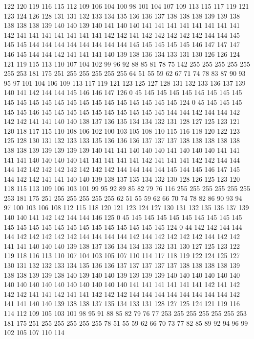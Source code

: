 122 120 119 116 115 112 109 106 104 100 98 101 104 107 109 113 115 117 119 121
123 124 126 128 131 131 132 133 134 135 136 136 137 138 138 138 139 139 138 138
138 138 139 140 140 139 140 141 140 140 141 141 141 141 141 141 141 141 142 141
141 141 141 141 141 141 142 142 141 142 142 142 142 142 144 144 145 145 145 144
144 144 144 144 144 144 144 145 145 145 145 145 146 147 147 147 146 145 144 144
142 141 141 141 140 139 138 136 134 133 131 130 126 126 124 121 119 115 113 110
107 104 102 99 96 92 88 85 81 78 75 142 255 255 255 255 255 255 253 181
175 251 255 255 255 255 255 64 51 55 59 62 67 71 74 78 83 87 90 93
95 97 101 104 106 109 113 117 119 121 123 125 127 128 131 132 133 136 137 139
140 141 142 144 144 145 146 146 147 126 0 45 145 145 145 145 145 145 145 145
145 145 145 145 145 145 145 145 145 145 145 145 145 145 124 0 45 145 145 145
145 145 146 145 145 145 145 145 145 145 145 145 145 144 144 142 144 144 142 142
142 141 141 140 140 138 137 136 135 134 134 132 131 128 127 125 123 121 120 118
117 115 110 108 106 102 100 103 105 108 110 115 116 118 120 122 123 125 128 130
131 132 133 133 135 136 136 136 137 137 137 138 138 138 138 138 138 138 139 139
139 139 139 140 141 141 140 140 140 141 140 140 140 141 141 141 141 140 140 140
140 141 141 141 141 141 142 141 141 141 142 142 144 144 144 142 142 142 142 142
142 142 142 144 144 144 144 145 144 145 146 147 145 144 142 142 141 141 140 140
139 138 137 135 134 132 130 128 126 125 123 120 118 115 113 109 106 103 101 99
95 92 89 85 82 79 76 116 255 255 255 255 255 255 253 181 175 251 255 255
255 255 255 62 51 55 59 62 66 70 74 78 82 86 90 93 94 97 100 103
106 108 112 115 118 120 121 123 124 127 130 131 132 135 136 137 139 140 140 141
142 142 144 144 146 125 0 45 145 145 145 145 145 145 145 145 145 145 145 145
145 145 145 145 145 145 145 145 145 145 124 0 44 142 142 144 144 144 142 142
142 142 142 144 144 144 144 142 144 142 142 142 142 144 142 142 141 141 140 140
140 139 138 137 136 134 134 133 132 131 130 127 125 123 122 119 118 116 113 110
107 104 103 105 107 110 114 117 118 119 122 124 125 127 130 131 132 132 133 134
135 136 136 137 137 137 137 137 138 138 138 138 139 138 138 139 139 138 140 139
140 140 139 139 139 139 140 140 140 140 140 140 140 140 140 140 140 140 140 140
140 140 141 141 141 141 141 141 142 141 142 142 142 141 141 142 141 141 142 142
142 144 144 144 144 144 144 144 144 142 141 141 140 140 139 138 138 137 135 134
133 131 128 127 125 124 121 119 116 114 112 109 105 103 101 98 95 91 88 85
82 79 76 77 253 255 255 255 255 255 253 181 175 251 255 255 255 255 255 78
51 55 59 62 66 70 73 77 82 85 89 92 94 96 99 102 105 107 110 114
